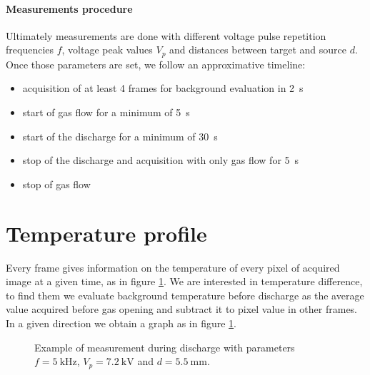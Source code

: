 \paragraph{Measurements procedure}
Ultimately measurements are done with different voltage pulse repetition frequencies $f$, voltage peak values $V_p$ and distances between target and source $d$.
Once those parameters are set, we follow an approximative timeline:
\begin{itemize}
 \item acquisition of at least \num{4} frames for background evaluation in \SI{2}{\second}
 \item start of gas flow for a minimum of \SI{5}{\second}
 \item start of the discharge for a minimum of \SI{30}{\second}
 \item stop of the discharge and acquisition with only gas flow for \SI{5}{\second}
 \item stop of gas flow
\end{itemize}


\section{Temperature profile}
Every frame gives information on the temperature of every pixel of acquired image at a given time, as in figure \ref{fig:exframe}. We are interested in temperature difference, to find them we evaluate background temperature before discharge as the average value acquired before gas opening and subtract it to pixel value in other frames. In a given direction we obtain a graph as in figure \ref{fig:exframe}.
\begin{figure}
 \centering
 \hfill
 \caption{Example of measurement during discharge with parameters $f = \SI{5}{\kilo\hertz}$, $V_p = \SI{7.2}{\kilo\volt}$ and $d = \SI{5.5}{\milli\meter}$.}
 \label{fig:exframe}
\end{figure}


